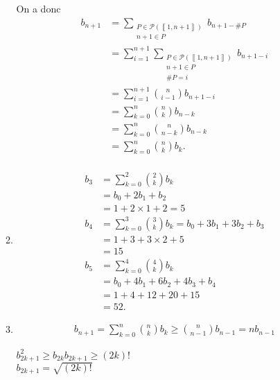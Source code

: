 \begin{enumerate}
\begin{enumerate}
				On a donc
				\begin{align*}
					b_{n+1} &= \sum_{\substack{P \in \mathcal{P}(\left\llbracket 1,n+1 \right\rrbracket)\\n+1 \in P}} b_{n+1 - \#P}\\
					&= \sum_{i=1}^{n+1} \sum_{\substack{P \in \mathcal{P}(\left\llbracket 1,n+1 \right\rrbracket)\\n+1 \in P\\\#P = i}} b_{n+1 - i}\\
					&= \sum_{i=1}^{n+1} {n \choose i-1}b_{n+1-i} \\
					&= \sum_{k=0}^n {n \choose k} b_{n-k} \\
					&= \sum_{k=0}^n {n \choose n-k} b_{n-k} \\
					&= \sum_{k=0}^n {n \choose k} b_k .\\
				\end{align*}
			\item
				\begin{align*}
					b_3 &= \sum_{k=0}^2 {2 \choose k} b_k\\
					&= b_0 + 2b_1 + b_2 \\
					&= 1 + 2\times 1 + 2 = 5 \\[3mm]
					b_4 &= \sum_{k=0}^3 {3 \choose k} b_k = b_0 + 3b_1 + 3b_2 + b_3\\
					&= 1 + 3 + 3 \times 2 + 5 \\
					&= 15 \\[3mm]
					b_5 &= \sum_{k=0}^4 {4 \choose k} b_k \\
					&= b_0 + 4b_1 + 6b_2 + 4b_3 + b_4 \\
					&= 1 + 4 + 12 + 20 + 15 \\
					&= 52.
				\end{align*}
			\item
				\begin{align*}
					b_{n+1} = \sum_{k=0}^n {n \choose k} b_k  \ge {n \choose n - 1} b_{n-1} = nb_{n-1}
				\end{align*}

				$b^2_{2k+1} \ge b_{2k} b_{2k+1} \ge (2k)!$\\
				$b_{2k+1} = \sqrt{(2k)!}$
		\end{enumerate}
\end{enumerate}


